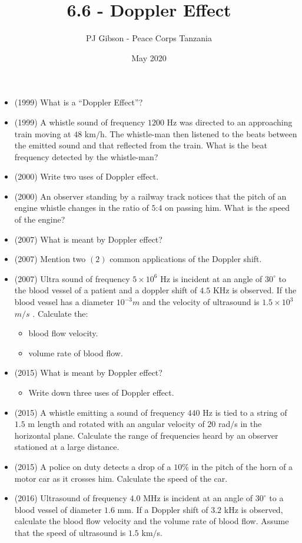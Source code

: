 \documentclass{article}
\title{\textbf{6.6 - Doppler Effect}}
\author{PJ Gibson - Peace Corps Tanzania}
\date{May 2020}
\begin{document}
\maketitle

\begin{itemize}
\item (1999)  What is a “Doppler Effect”?
\item (1999)  A whistle sound of frequency $ 1200$ Hz was directed to an approaching train moving at $ 48$ km$/$h​ . The whistle-man then listened to the beats between the emitted sound and that reflected from the train. What is the beat frequency detected by the whistle-man?
\item (2000)  Write two uses of Doppler effect.
\item (2000)  An observer standing by a railway track notices that the pitch of an engine whistle changes in the ratio of $ 5$:$ 4$ on passing him. What is the speed of the engine?
\item (2007)  What is meant by Doppler effect? 
\item (2007)  Mention two $ (2)$ common applications of the Doppler shift. 
\item (2007)  Ultra sound of frequency $ 5 \times 10^{6}$ Hz is incident at an angle of $ 30^{\circ}$ to the blood vessel of a patient and a doppler shift of $ 4.5$ KHz is observed. If the blood vessel has a diameter $ 10^{-3}m$ and the velocity of ultrasound is $ 1.5 \times 10^{3}$  $ m/s$ . Calculate the:
 \begin{itemize}
\item blood flow velocity. 
\item volume rate of blood flow. 
\end{itemize}
\item (2015)  What is meant by Doppler effect?
 \begin{itemize}
\item Write down three uses of Doppler effect.
\end{itemize}
\item (2015)  A whistle emitting a sound of frequency $ 440$ Hz is tied to a string of $ 1.5$ m length and rotated with an angular velocity of $ 20$ rad$/$s in the horizontal plane.  Calculate the range of frequencies heard by an observer stationed at a large distance.
\item (2015)  A police on duty detects a drop of a $ 10\%$ in the pitch of the horn of a motor car as it crosses him. Calculate the speed of the car.
\item (2016)  Ultrasound of frequency $ 4.0$ MHz is incident at an angle of $ 30^{\circ}$ to a blood vessel of diameter $ 1.6$ mm.  If a Doppler shift of $ 3.2$ kHz is observed, calculate the blood flow velocity and the volume rate of blood flow.  Assume that the speed of ultrasound is $ 1.5$ km$/$s.

\end{itemize}
\end{document}
